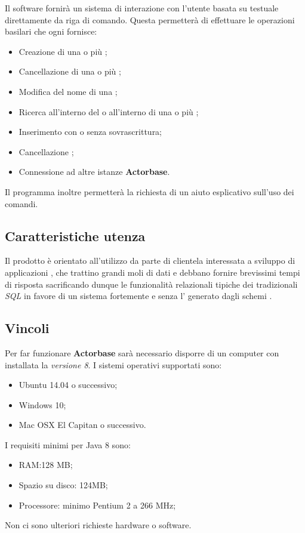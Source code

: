 \documentclass{scalatekids-article}
\begin{document}
Il software fornirà un sistema di interazione con l'utente basata su 
testuale direttamente da riga di comando. Questa permetterà di effettuare le operazioni
basilari che ogni  fornisce:
\begin{itemize}
\item Creazione di una o più ;
\item Cancellazione di una o più ;
\item Modifica del nome di una ;
\item Ricerca all'interno del  o all'interno di una o più ;
\item Inserimento  con o senza sovrascrittura;
\item Cancellazione ;
\item Connessione ad altre istanze \textbf{Actorbase}.
\end{itemize}
Il programma inoltre permetterà la richiesta di un aiuto esplicativo sull'uso
dei comandi.

\subsection{Caratteristiche utenza}

Il prodotto è orientato all'utilizzo da parte di clientela interessata a
sviluppo di applicazioni , che trattino grandi moli di dati e
debbano fornire brevissimi tempi di risposta sacrificando dunque le funzionalità
relazionali tipiche dei tradizionali  \textit{SQL} in favore di
un sistema fortemente  e senza l' generato
dagli schemi .

\subsection{Vincoli}

Per far funzionare \textbf{Actorbase} sarà necessario disporre di un computer con
installata la \textit{ versione 8}. I sistemi operativi supportati sono:
\begin{itemize}
\item Ubuntu 14.04 o successivo;
\item Windows 10;
\item Mac OSX El Capitan o successivo.
\end{itemize}
I requisiti minimi per Java 8 sono:
\begin{itemize}
\item RAM:\@128 MB;\@
\item Spazio su disco: 124MB;\@
\item Processore: minimo Pentium 2 a 266 MHz;
\end{itemize}
Non ci sono ulteriori richieste hardware o software.
\end{document}
